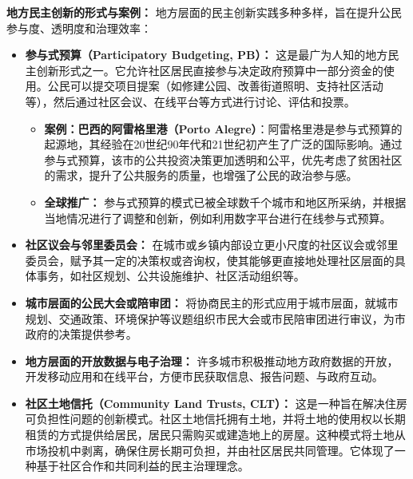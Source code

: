 \documentclass[UTF8, 10pt]{ctexbook}
\begin{document}
\textbf{地方民主创新的形式与案例：}
地方层面的民主创新实践多种多样，旨在提升公民参与度、透明度和治理效率：
\begin{itemize}
    \item \textbf{参与式预算（Participatory Budgeting, PB）：} 这是最广为人知的地方民主创新形式之一。它允许社区居民直接参与决定政府预算中一部分资金的使用。公民可以提交项目提案（如修建公园、改善街道照明、支持社区活动等），然后通过社区会议、在线平台等方式进行讨论、评估和投票。
    \begin{itemize}
        \item \textbf{案例：巴西的阿雷格里港（Porto Alegre）}：阿雷格里港是参与式预算的起源地，其经验在20世纪90年代和21世纪初产生了广泛的国际影响。通过参与式预算，该市的公共投资决策更加透明和公平，优先考虑了贫困社区的需求，提升了公共服务的质量，也增强了公民的政治参与感。
        \item \textbf{全球推广：} 参与式预算的模式已被全球数千个城市和地区所采纳，并根据当地情况进行了调整和创新，例如利用数字平台进行在线参与式预算。
    \end{itemize}
    \item \textbf{社区议会与邻里委员会：} 在城市或乡镇内部设立更小尺度的社区议会或邻里委员会，赋予其一定的决策权或咨询权，使其能够更直接地处理社区层面的具体事务，如社区规划、公共设施维护、社区活动组织等。
    \item \textbf{城市层面的公民大会或陪审团：} 将协商民主的形式应用于城市层面，就城市规划、交通政策、环境保护等议题组织市民大会或市民陪审团进行审议，为市政府的决策提供参考。
    \item \textbf{地方层面的开放数据与电子治理：} 许多城市积极推动地方政府数据的开放，开发移动应用和在线平台，方便市民获取信息、报告问题、与政府互动。
    \item \textbf{社区土地信托（Community Land Trusts, CLT）：} 这是一种旨在解决住房可负担性问题的创新模式。社区土地信托拥有土地，并将土地的使用权以长期租赁的方式提供给居民，居民只需购买或建造地上的房屋。这种模式将土地从市场投机中剥离，确保住房长期可负担，并由社区居民共同管理。它体现了一种基于社区合作和共同利益的民主治理理念。
\end{itemize}
\end{document}
